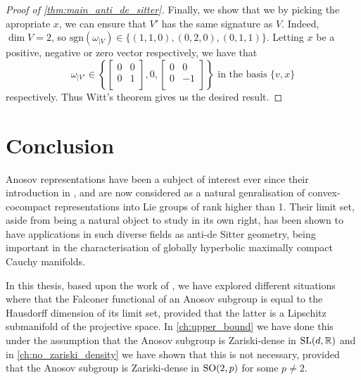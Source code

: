 \documentclass{report}
\begin{document}
\begin{proof}[Proof of \cref{thm:main_anti_de_sitter}]
    Finally, we show that we by picking the apropriate $x$, we can ensure that $V'$ has the same signature as $V$.
    Indeed, $\dim V = 2$, so $\mathrm{sgn}(\omega_{|V}) \in \{ (1,1,0), (0,2,0), (0,1,1) \}$.
    Letting $x$ be a positive, negative or zero vector respectively, we have that 
    \[
    \omega_{|V'} \in \left\{
        \begin{bmatrix}
        0 & 0 \\
        0 & 1 \\
        \end{bmatrix},
        0,
        \begin{bmatrix}
            0 & 0 \\
            0 & -1 \\
        \end{bmatrix}
    \right\} \text{ in the basis } \{v, x\}
    \]
    respectively.
    Thus Witt's theorem gives us the desired result.
\end{proof}

\chapter{Conclusion}
Anosov representations have been a subject of interest ever since their introduction in \cite{labourie_anosov_2006}, and are now considered as a natural genralisation of convex-cocompact representations into Lie groups of rank higher than 1.
Their limit set, aside from being a natural object to study in its own right, has been shown to have applications in such diverse fields as anti-de Sitter geometry, being important in the characterisation of globally hyperbolic maximally compact Cauchy manifolds.

In this thesis, based upon the work of \cite{pozzetti_anosov_2023}, we have explored different situations where that the Falconer functional of an Anosov subgroup is equal to the Hausdorff dimension of its limit set, provided that the latter is a Lipschitz submanifold of the projective space.
In \cref{ch:upper_bound} we have done this under the assumption that the Anosov subgroup is Zariski-dense in $\operatorname{{\mathrm{SL}}}(d, \mathbb R)$ and in \cref{ch:no_zariski_density} we have shown that this is not necessary, provided that the Anosov subgroup is Zariski-dense in $\operatorname{{\mathrm{SO}}}(2,p)$ for some $p \neq 2$.
\end{document}
